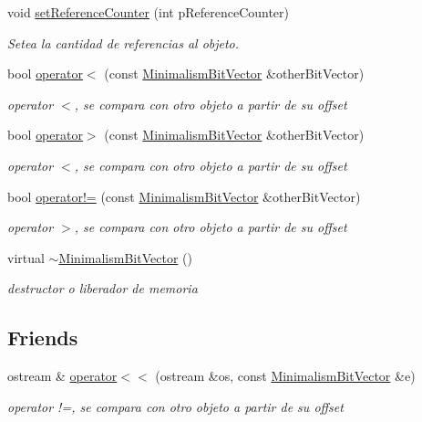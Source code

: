 \begin{DoxyCompactItemize}
void \hyperlink{class_minimalism_bit_vector_af65272b7663cfc96d2a8fd16668b8570}{set\-Reference\-Counter} (int p\-Reference\-Counter)
\begin{DoxyCompactList}\small\item\em Setea la cantidad de referencias al objeto. \end{DoxyCompactList}\item 
bool \hyperlink{class_minimalism_bit_vector_ab6073c581675be3a1a8837aea19babb0}{operator$<$} (const \hyperlink{class_minimalism_bit_vector}{Minimalism\-Bit\-Vector} \&other\-Bit\-Vector)
\begin{DoxyCompactList}\small\item\em operator $<$, se compara con otro objeto a partir de su offset \end{DoxyCompactList}\item 
bool \hyperlink{class_minimalism_bit_vector_ae81b007ae02dc1263bda1bc0d217c125}{operator$>$} (const \hyperlink{class_minimalism_bit_vector}{Minimalism\-Bit\-Vector} \&other\-Bit\-Vector)
\begin{DoxyCompactList}\small\item\em operator $<$, se compara con otro objeto a partir de su offset \end{DoxyCompactList}\item 
bool \hyperlink{class_minimalism_bit_vector_afa354ed29c29fcea2bfc453aa2edb9e7}{operator!=} (const \hyperlink{class_minimalism_bit_vector}{Minimalism\-Bit\-Vector} \&other\-Bit\-Vector)
\begin{DoxyCompactList}\small\item\em operator $>$, se compara con otro objeto a partir de su offset \end{DoxyCompactList}\item 
\hypertarget{class_minimalism_bit_vector_a3c8458d181a7dedc5fe95d4e4cc1667a}{virtual \hyperlink{class_minimalism_bit_vector_a3c8458d181a7dedc5fe95d4e4cc1667a}{$\sim$\-Minimalism\-Bit\-Vector} ()}\label{class_minimalism_bit_vector_a3c8458d181a7dedc5fe95d4e4cc1667a}

\begin{DoxyCompactList}\small\item\em destructor o liberador de memoria \end{DoxyCompactList}\end{DoxyCompactItemize}
\subsection*{Friends}
\begin{DoxyCompactItemize}
\item 
ostream \& \hyperlink{class_minimalism_bit_vector_ab3123b16267666cc75c71b1cfb9a8a52}{operator$<$$<$} (ostream \&os, const \hyperlink{class_minimalism_bit_vector}{Minimalism\-Bit\-Vector} \&e)
\begin{DoxyCompactList}\small\item\em operator !=, se compara con otro objeto a partir de su offset \end{DoxyCompactList}\end{DoxyCompactItemize}



